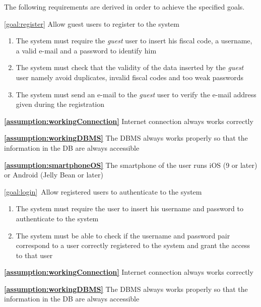 	The following requirements are derived in order to achieve the specified goals.
	\begin{description}
		\item \ref{goal:register} Allow guest users to register to the system
			\begin{enumerate}[label=\textbf{R\arabic*}]
			
  				\item The system must require the \emph{guest} user to insert his fiscal code, a username, a valid e-mail and a password to identify him
  				
   				\item The system must check that the validity of the data inserted by the \emph{guest} user namely avoid duplicates, invalid fiscal codes and too weak passwords
   				
   				\item The system must send an e-mail to the \emph{guest} user to verify the e-mail address given during the registration
   
  			\end{enumerate}
  				
			\textbf{\ref{assumption:workingConnection}} Internet connection always works correctly
			
			\textbf{\ref{assumption:workingDBMS}} The DBMS always works properly so that the information in the DB are always accessible
			
			\textbf{\ref{assumption:smartphoneOS}} The smartphone of the user runs iOS (9 or later) or Android (Jelly Bean or later) \newline
			
  			
		\item \ref{goal:login}\ Allow registered users to authenticate to the system
			\begin{enumerate}[label=\textbf{R\arabic*}, resume]
  				\item The system must require the user to insert his username and password to authenticate to the system
   				\item The system must be able to check if the username and password pair correspond to a user correctly registered to the system and grant the access to that user 
			\end{enumerate}
			
			\textbf{\ref{assumption:workingConnection}} Internet connection always works correctly
			
			\textbf{\ref{assumption:workingDBMS}} The DBMS always works properly so that the information in the DB are always accessible \newline
			

\end{description}
